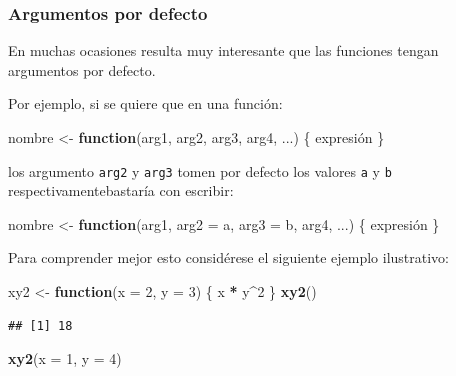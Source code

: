 \documentclass[]{book}
\newenvironment{Shaded}{\begin{snugshade}}{\end{snugshade}}
\newcommand{\ControlFlowTok}[1]{\textcolor[rgb]{0.13,0.29,0.53}{\textbf{#1}}}
\newcommand{\DataTypeTok}[1]{\textcolor[rgb]{0.13,0.29,0.53}{#1}}
\newcommand{\DecValTok}[1]{\textcolor[rgb]{0.00,0.00,0.81}{#1}}
\newcommand{\KeywordTok}[1]{\textcolor[rgb]{0.13,0.29,0.53}{\textbf{#1}}}
\newcommand{\NormalTok}[1]{#1}
\newcommand{\OperatorTok}[1]{\textcolor[rgb]{0.81,0.36,0.00}{\textbf{#1}}}
\newcommand{\StringTok}[1]{\textcolor[rgb]{0.31,0.60,0.02}{#1}}
\begin{document}
\hypertarget{argumentos-por-defecto}{%
\subsubsection{Argumentos por defecto}\label{argumentos-por-defecto}}

En muchas ocasiones
resulta muy interesante que las funciones tengan argumentos por defecto.

Por ejemplo, si se quiere que en una función:

\begin{Shaded}
\begin{Highlighting}[]
\NormalTok{nombre <-}\StringTok{ }\ControlFlowTok{function}\NormalTok{(arg1, arg2, arg3, arg4, ...) \{ expresión \}}
\end{Highlighting}
\end{Shaded}

los argumento \texttt{arg2} y \texttt{arg3} tomen por defecto los valores \texttt{a} y \texttt{b}
respectivamentebastaría con escribir:

\begin{Shaded}
\begin{Highlighting}[]
\NormalTok{nombre <-}\StringTok{ }\ControlFlowTok{function}\NormalTok{(arg1, }\DataTypeTok{arg2 =}\NormalTok{ a, }\DataTypeTok{arg3 =}\NormalTok{ b, arg4, ...) \{ expresión \}}
\end{Highlighting}
\end{Shaded}

Para comprender mejor esto considérese el siguiente ejemplo ilustrativo:

\begin{Shaded}
\begin{Highlighting}[]
\NormalTok{xy2 <-}\StringTok{ }\ControlFlowTok{function}\NormalTok{(}\DataTypeTok{x =} \DecValTok{2}\NormalTok{, }\DataTypeTok{y =} \DecValTok{3}\NormalTok{) \{ x }\OperatorTok{*}\StringTok{ }\NormalTok{y}\OperatorTok{^}\DecValTok{2}\NormalTok{ \}}
\KeywordTok{xy2}\NormalTok{()}
\end{Highlighting}
\end{Shaded}

\begin{verbatim}
## [1] 18
\end{verbatim}

\begin{Shaded}
\begin{Highlighting}[]
\KeywordTok{xy2}\NormalTok{(}\DataTypeTok{x =} \DecValTok{1}\NormalTok{, }\DataTypeTok{y =} \DecValTok{4}\NormalTok{)}
\end{Highlighting}
\end{Shaded}
\end{document}
